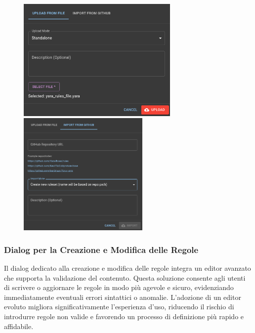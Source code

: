 \begin{figure}[H]
\centering
\begin{minipage}{0.45\textwidth}
\centering
\includegraphics[width=\textwidth,height=6cm]{images/volweb-esteso/volweb-upload-dialog.png}
\end{minipage}
\hspace{0.05\textwidth}
\begin{minipage}{0.45\textwidth}
\centering
\includegraphics[width=\textwidth,height=6cm]{images/volweb-esteso/volweb-import-dialog.png}
\end{minipage}
\end{figure}

\subsubsection{Dialog per la Creazione e Modifica delle Regole}
Il dialog dedicato alla creazione e modifica delle regole integra un editor avanzato che supporta la validazione del contenuto. Questa soluzione consente agli utenti di scrivere o aggiornare le regole in modo più agevole e sicuro, evidenziando immediatamente eventuali errori sintattici o anomalie. L'adozione di un editor evoluto migliora significativamente l'esperienza d'uso, riducendo il rischio di introdurre regole non valide e favorendo un processo di definizione più rapido e affidabile.

